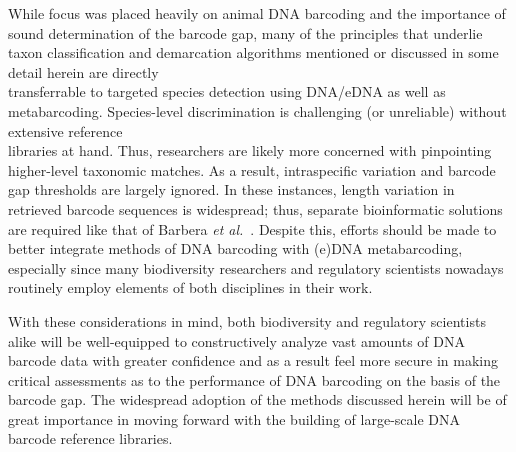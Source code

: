 While focus was placed heavily on animal DNA barcoding and the importance of sound determination of the barcode gap, many of the principles that underlie taxon classification and demarcation algorithms mentioned or discussed in some detail herein are directly \\ transferrable to targeted species detection using DNA/eDNA as well as metabarcoding. Species-level discrimination is challenging (or unreliable) without extensive reference \\ libraries at hand. Thus, researchers are likely more concerned with pinpointing higher-level taxonomic matches. As a result, intraspecific variation and  barcode gap thresholds are largely ignored. In these instances, length variation in retrieved barcode sequences is widespread; thus, separate bioinformatic solutions are required like that of Barbera \textit{et al.}~\cite{barbera2019epang}. Despite this, efforts should be made to better integrate methods of DNA barcoding with (e)DNA metabarcoding, especially since many biodiversity researchers and regulatory scientists nowadays routinely employ elements of both disciplines in their work. 

    


With these considerations in mind, both biodiversity and regulatory scientists alike will be well-equipped to constructively analyze vast amounts of DNA barcode data with greater confidence and as a result feel more secure in making critical assessments as to the performance of DNA barcoding on the basis of the barcode gap. The widespread adoption of the methods discussed herein will be of great importance in moving forward with the building of large-scale DNA barcode reference libraries.
